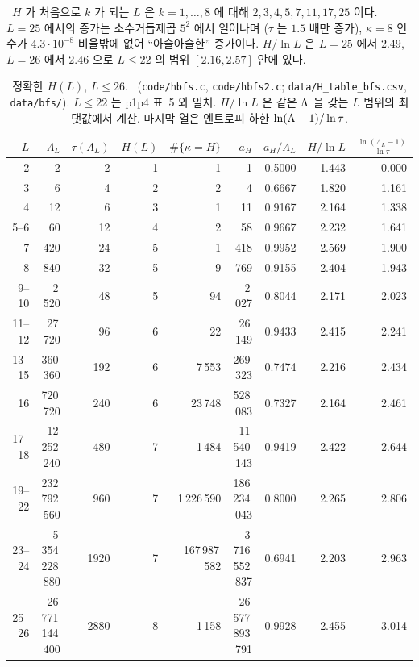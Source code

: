 \begin{remark}\label{NUM:rem-H25}
\HEUR\ $H$ 가 처음으로 $k$ 가 되는 $L$ 은 $k=1,\dots,8$ 에 대해 $2,3,4,5,7,11,17,25$ 이다. $L=25$ 에서의 증가는 소수거듭제곱 $5^2$ 에서 일어나며
($\tau$ 는 $1.5$ 배만 증가), $\kappa=8$ 인 수가 $4.3\cdot10^{-8}$ 비율밖에 없어 ``아슬아슬한'' 증가이다. $H/\ln L$ 은 $L=25$ 에서 $2.49$, $L=26$ 에서 $2.46$ 으로
$L\le22$ 의 범위 $[2.16,2.57]$ 안에 있다.
\end{remark}


\begin{table}[ht]\centering\small
\begin{tabular}{rrrrrrrrr}
\toprule
$L$ & $\Lambda_L$ & $\tau(\Lambda_L)$ & $H(L)$ & $\#\{\kappa=H\}$ & $a_H$ & $a_H/\Lambda_L$ & $H/\ln L$ & $\frac{\ln(\Lambda_L-1)}{\ln\tau}$\\
\midrule
2 & 2 & 2 & 1 & 1 & 1 & 0.5000 & 1.443 & 0.000\\
3 & 6 & 4 & 2 & 2 & 4 & 0.6667 & 1.820 & 1.161\\
4 & 12 & 6 & 3 & 1 & 11 & 0.9167 & 2.164 & 1.338\\
5--6 & 60 & 12 & 4 & 2 & 58 & 0.9667 & 2.232 & 1.641\\
7 & 420 & 24 & 5 & 1 & 418 & 0.9952 & 2.569 & 1.900\\
8 & 840 & 32 & 5 & 9 & 769 & 0.9155 & 2.404 & 1.943\\
9--10 & 2\,520 & 48 & 5 & 94 & 2\,027 & 0.8044 & 2.171 & 2.023\\
11--12 & 27\,720 & 96 & 6 & 22 & 26\,149 & 0.9433 & 2.415 & 2.241\\
13--15 & 360\,360 & 192 & 6 & 7\,553 & 269\,323 & 0.7474 & 2.216 & 2.434\\
16 & 720\,720 & 240 & 6 & 23\,748 & 528\,083 & 0.7327 & 2.164 & 2.461\\
17--18 & 12\,252\,240 & 480 & 7 & 1\,484 & 11\,540\,143 & 0.9419 & 2.422 & 2.644\\
19--22 & 232\,792\,560 & 960 & 7 & 1\,226\,590 & 186\,234\,043 & 0.8000 & 2.265 & 2.806\\
23--24 & 5\,354\,228\,880 & 1920 & 7 & 167\,987\,582 & 3\,716\,552\,837 & 0.6941 & 2.203 & 2.963\\
25--26 & 26\,771\,144\,400 & 2880 & 8 & 1\,158 & 26\,577\,893\,791 & 0.9928 & 2.455 & 3.014\\
\bottomrule
\end{tabular}
\caption{정확한 $H(L)$, $L\le 26$. \NUMERIC\ (\texttt{code/hbfs.c}, \texttt{code/hbfs2.c}; \texttt{data/H\_table\_bfs.csv}, \texttt{data/bfs/}).
$L\le 22$ 는 p1p4 표~5 와 일치. $H/\ln L$ 은 같은 $\Lambda$ 을 갖는 $L$ 범위의 최댓값에서 계산. 마지막 열은 엔트로피 하한 $\ln(\Lambda-1)/\ln\tau$.}\label{NUM:tab-H}
\end{table}

